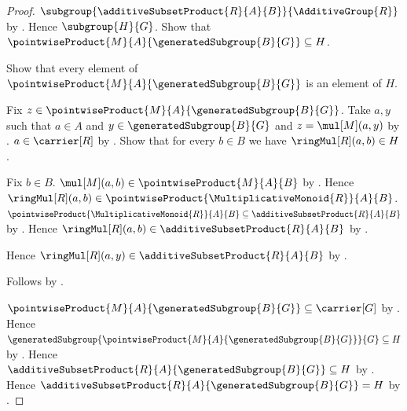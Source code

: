 \begin{proof}
    $\subgroup{\additiveSubsetProduct{R}{A}{B}}{\AdditiveGroup{R}}$ by
        .
    Hence $\subgroup{H}{G}$.
    Show that
        $\pointwiseProduct{M}{A}{\generatedSubgroup{B}{G}}\subseteq H$.
    \begin{subproof}
        Show that every element of
            $\pointwiseProduct{M}{A}{\generatedSubgroup{B}{G}}$ is an
            element of $H$.
        \begin{subproof}
            Fix $z\in
                \pointwiseProduct{M}{A}{\generatedSubgroup{B}{G}}$.
            Take $a,y$ such that $a\in A$ and
                $y\in\generatedSubgroup{B}{G}$ and $z=\mul[M](a,y)$ by
                .
            $a\in\carrier[R]$ by .
            Show that for every $b\in B$ we have $\ringMul[R](a,b)\in H$.
            \begin{subproof}
                Fix $b\in B$.
                $\mul[M](a,b)\in\pointwiseProduct{M}{A}{B}$ by
                    .
                Hence $\ringMul[R](a,b)\in
                    \pointwiseProduct{\MultiplicativeMonoid{R}}{A}{B}$.
                $\pointwiseProduct{\MultiplicativeMonoid{R}}{A}{B}
                    \subseteq\additiveSubsetProduct{R}{A}{B}$ by
                    .
                Hence $\ringMul[R](a,b)\in
                    \additiveSubsetProduct{R}{A}{B}$ by
                    .
            \end{subproof}
            Hence $\ringMul[R](a,y)\in
                \additiveSubsetProduct{R}{A}{B}$ by
                .
        \end{subproof}
        Follows by .
    \end{subproof}
    $\pointwiseProduct{M}{A}{\generatedSubgroup{B}{G}}
        \subseteq\carrier[G]$ by .
    Hence $\generatedSubgroup{
        \pointwiseProduct{M}{A}{\generatedSubgroup{B}{G}}}{G}
        \subseteq H$ by .
    Hence $\additiveSubsetProduct{R}{A}{\generatedSubgroup{B}{G}}
        \subseteq H$ by .
    Hence $\additiveSubsetProduct{R}{A}{\generatedSubgroup{B}{G}}=H$ by
        .
\end{proof}

